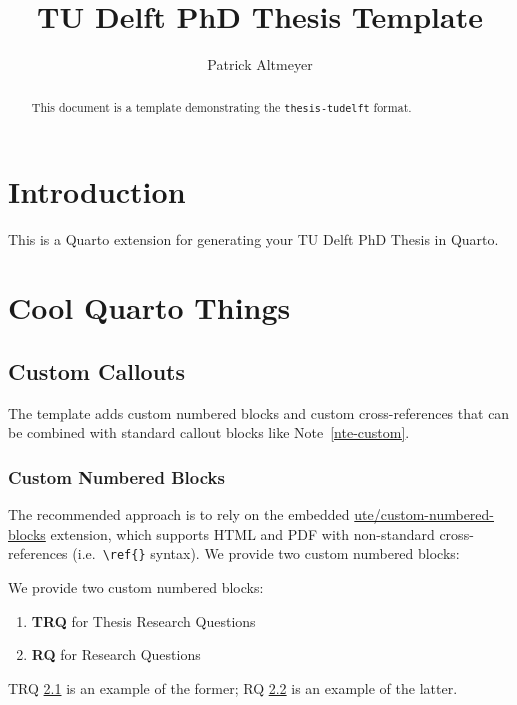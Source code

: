 \documentclass{tudelft}
\title{TU Delft PhD Thesis Template}
\author{Patrick Altmeyer}
\date{}
\providecommand{\tightlist}{%
  \setlength{\itemsep}{0pt}\setlength{\parskip}{0pt}}\usepackage{longtable,booktabs,array}
\begin{document}
\maketitle
\begin{abstract}
This document is a template demonstrating the \texttt{thesis-tudelft}
format.
\end{abstract}



\section{Introduction}\label{introduction}

This is a Quarto extension for generating your TU Delft PhD Thesis in
Quarto.

\section{Cool Quarto Things}\label{cool-quarto-things}

\subsection{Custom Callouts}\label{custom-callouts}

The template adds custom numbered blocks and custom cross-references
that can be combined with standard callout blocks like
Note~\ref{nte-custom}.

\subsubsection{Custom Numbered Blocks}\label{custom-numbered-blocks}

The recommended approach is to rely on the embedded
\href{https://github.com/ute/custom-numbered-blocks}{ute/custom-numbered-blocks}
extension, which supports HTML and PDF with non-standard
cross-references (i.e.~\texttt{\textbackslash{}ref\{\}} syntax). We
provide two custom numbered blocks:

We provide two custom numbered blocks:

\begin{enumerate}
\def\labelenumi{\arabic{enumi}.}
\tightlist
\item
  \textbf{TRQ} for Thesis Research Questions
\item
  \textbf{RQ} for Research Questions
\end{enumerate}

TRQ \hyperref[trq:what]{2.1} is an example of the former; RQ
\hyperref[rq:what]{2.2} is an example of the latter.
\end{document}
